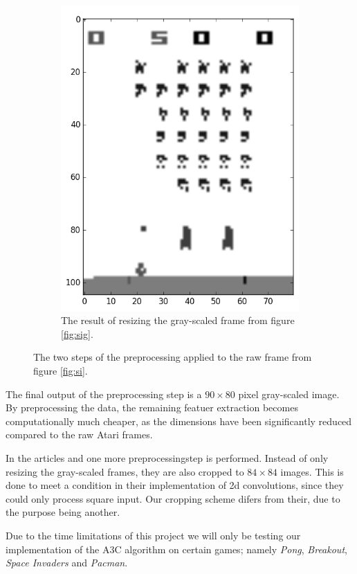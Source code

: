 \documentclass[11pt]{article}
\begin{document}
\begin{figure}[h!]
\begin{subfigure}[t]{.5\textwidth}
        \includegraphics[scale=0.35]{include/space_invaders_1_gray_resized.png}
        \caption{The result of resizing the gray-scaled frame from figure \ref{fig:sig}.}
        \label{fig:scanlike}
    \end{subfigure}
    \caption{The two steps of the preprocessing applied to the raw frame from figure \ref{fig:si}.}
\end{figure}


The final output of the preprocessing step is a $90 \times 80$ pixel gray-scaled
image.
By preprocessing the data, the remaining featuer extraction becomes computationally much
cheaper, as the dimensions have been significantly reduced compared to the raw Atari frames.

In the articles \cite{a3c} and \cite{dqn} one more preprocessingstep is performed.
Instead of only resizing the gray-scaled frames, they are also cropped to $84 \times 84$ images.
This is done to meet a condition in their implementation of 2d convolutions,
since they could only process square input\cite{dqn-nature}.
Our cropping scheme difers from their, due to the purpose being another.

Due to the time limitations of this project we will only be testing our
implementation of the A3C algorithm on certain games;
namely \textit{Pong}, \textit{Breakout}, \textit{Space Invaders} and
\textit{Pacman}.
\end{document}
